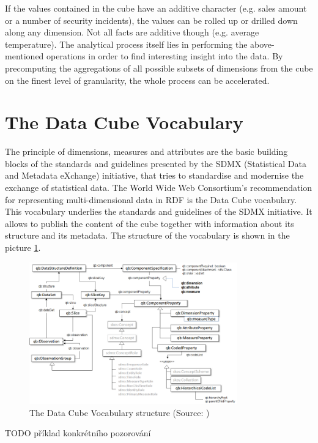 If the values contained in the cube have an additive character (e.g. sales amount or a number of security incidents), the values can be rolled up or drilled down along any dimension. Not all facts are additive though (e.g. average temperature). The analytical process itself lies in performing the above-mentioned operations in order to find interesting insight into the data. By precomputing the aggregations of all possible subsets of dimensions from the cube on the finest level of granularity, the whole process can be accelerated.

\section{The Data Cube Vocabulary\label{dcv}}

The principle of dimensions, measures and attributes are the basic building blocks of the standards and guidelines presented by the SDMX (Statistical Data and Metadata eXchange) initiative, that tries to standardise and modernise the exchange of statistical data. The World Wide Web Consortium's recommendation for representing multi-dimensional data in RDF is the Data Cube vocabulary. This vocabulary underlies the standards and guidelines of the SDMX initiative. It allows to publish the content of the cube together with information about its structure and its metadata. The structure of the vocabulary is shown in the picture \ref{qbstructureimg}.

\begin{figure}[h]
\centering
\includegraphics[width=0.8\textwidth]{img/qbstructure.png}
\caption{The Data Cube Vocabulary structure (Source: \cite{Cyganiak:14:TRD})}
\label{qbstructureimg}
\end{figure}

TODO příklad konkrétního pozorování


